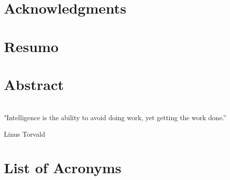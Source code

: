\documentclass[a4paper, 11pt]{book}
\begin{document}
\frontmatter

\newpage\thispagestyle{empty}

\pagestyle{plain}



\chapter*{Acknowledgments}


\chapter*{Resumo}


\chapter*{Abstract}


\chapter*{}
\setlength\epigraphwidth{12cm}
\setlength\epigraphrule{0pt}
\makeatletter
{}
\makeatother
\vspace*{\fill}
\epigraph{"Intelligence is the ability to avoid doing work, yet getting the work done.”}
{Linus Torvald}
\vspace*{\fill}

\pagestyle{plain}
\cleardoublepage
{}
\tableofcontents

\chapter*{List of Acronyms}


\listoffigures

\listoftables
\end{document}
